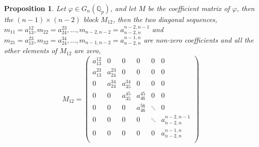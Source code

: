 \documentclass[12pt,fleqn]{article}
\newtheorem{proposition}[theorem]{Proposition}
\begin{document}
\begin{proposition}
Let $\varphi\in G_n(\mathbb{Q}_p)$, and let $M$ be the coefficient matrix of $\varphi$, then the $(n-1)\times(n-2)$ block $M_{12}$, then the two diagonal sequences, $m_{11}=a_{13}^{12},m_{22}=a_{24}^{23},\dots,m_{n-2,n-2}=a_{n-2,n}^{n-2,n-1}$ and $m_{21}=a_{13}^{23},m_{32}=a_{24}^{34},\dots,m_{n-1,n-2}=a_{n-2,n}^{n-1,n}$ are non-zero coefficients and all the other elements of $M_{12}$ are zero,\[M_{12}=\begin{pmatrix}
a_{13}^{12} & 0 & 0 & 0 & 0 & 0\\
a_{13}^{23} & a_{24}^{23} & 0 & 0 & 0 & 0\\
0 & a_{24}^{34} & a_{35}^{34} & 0 & 0 & 0\\
0 & 0 & a_{35}^{45} & a_{46}^{45} & 0 & 0\\
0 & 0 & 0 & a_{46}^{56} & \ddots & 0\\
0 & 0 & 0 & 0 & \ddots & a_{n-2,n}^{n-2,n-1}\\
0 & 0 & 0 & 0 & 0 & a_{n-2,n}^{n-1,n}\\
\end{pmatrix}
\]
\end{proposition}
\end{document}
